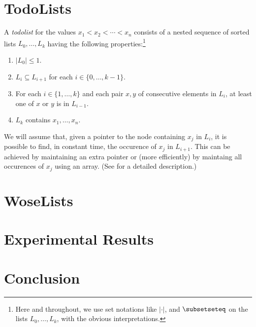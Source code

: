 \documentclass[lotsofwhite]{patmorin}
\begin{document}
\section{TodoLists}

A \emph{todolist} for the values $x_1<x_2<\cdots<x_n$ consists of a nested
sequence of sorted lists $L_0,\ldots,L_k$ having the following properties:\footnote{Here and throughout, we use set notations like $|\cdot|$, and $\subsetseteq$ on the lists $L_0,\ldots,L_k$, with the obvious interpretations.}

\begin{enumerate}
\item $|L_0| \le 1$.
\item $L_i\subseteq L_{i+1}$ for each $i\in\{0,\ldots,k-1\}$.
\item For each $i\in\{1,\ldots,k\}$ and each pair $x,y$ of consecutive elements in $L_i$, at least one of $x$ or $y$ is in $L_{i-1}$.
\item $L_k$ contains $x_1,\ldots,x_n$.
\end{enumerate}

We will assume that, given a pointer to the node containing $x_j$ in
$L_i$, it is possible to find, in constant time, the occurence of $x_j$
in $L_{i+1}$.  This can be achieved by maintaining an extra pointer
or (more efficiently) by maintaing all occurences of $x_j$ using an
array. (See  for a detailed description.)

\section{WoseLists}


\section{Experimental Results}

\section{Conclusion}

%
%
%
%
%
%
\end{document}
